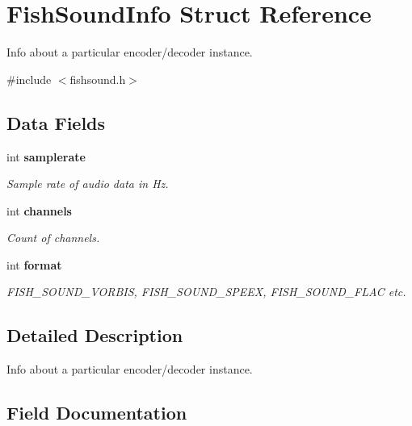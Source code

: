 \section{Fish\-Sound\-Info Struct Reference}
\label{structFishSoundInfo}


Info about a particular encoder/decoder instance.  




{\ttfamily \#include $<$fishsound.\-h$>$}

\subsection*{Data Fields}
\begin{DoxyCompactItemize}
\item 
int {\bf samplerate}\label{structFishSoundInfo_a9b19fb535b78f4df6cd4a275a595e736}

\begin{DoxyCompactList}\small\item\em Sample rate of audio data in Hz. \end{DoxyCompactList}\item 
int {\bf channels}\label{structFishSoundInfo_ac1e2bc71184e6311f54ff6bcd9160123}

\begin{DoxyCompactList}\small\item\em Count of channels. \end{DoxyCompactList}\item 
int {\bf format}
\begin{DoxyCompactList}\small\item\em F\-I\-S\-H\-\_\-\-S\-O\-U\-N\-D\-\_\-\-V\-O\-R\-B\-I\-S, F\-I\-S\-H\-\_\-\-S\-O\-U\-N\-D\-\_\-\-S\-P\-E\-E\-X, F\-I\-S\-H\-\_\-\-S\-O\-U\-N\-D\-\_\-\-F\-L\-A\-C etc. \end{DoxyCompactList}\end{DoxyCompactItemize}


\subsection{Detailed Description}
Info about a particular encoder/decoder instance. 

\subsection{Field Documentation}
